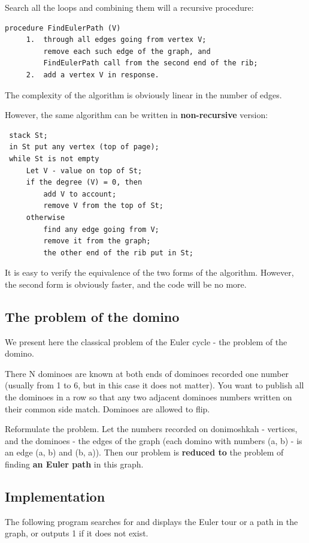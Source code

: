 Search all the loops and combining them will a recursive procedure:

\begin{verbatim}
procedure FindEulerPath (V)
     1.  through all edges going from vertex V;
         remove each such edge of the graph, and
         FindEulerPath call from the second end of the rib;
     2.  add a vertex V in response. 
\end{verbatim}
The complexity of the algorithm is obviously linear in the number of edges.

However, the same algorithm can be written in \textbf{non-recursive} version:

\begin{verbatim}
 stack St;
 in St put any vertex (top of page);
 while St is not empty
     Let V - value on top of St;
     if the degree (V) = 0, then
         add V to account;
         remove V from the top of St;
     otherwise
         find any edge going from V;
         remove it from the graph;
         the other end of the rib put in St;

\end{verbatim}
It is easy to verify the equivalence of the two forms of the algorithm. However, the second form is obviously faster, and the code will be no more.

\subsection{ The problem of the domino }
We present here the classical problem of the Euler cycle - the problem of the domino.

There N dominoes are known at both ends of dominoes recorded one number (usually from 1 to 6, but in this case it does not matter). You want to publish all the dominoes in a row so that any two adjacent dominoes numbers written on their common side match. Dominoes are allowed to flip.

Reformulate the problem. Let the numbers recorded on donimoshkah - vertices, and the dominoes - the edges of the graph (each domino with numbers (a, b) - is an edge (a, b) and (b, a)). Then our problem is \textbf{reduced to} the problem of finding \textbf{an Euler path} in this graph.

\subsection{ Implementation }
The following program searches for and displays the Euler tour or a path in the graph, or outputs 1 if it does not exist.

